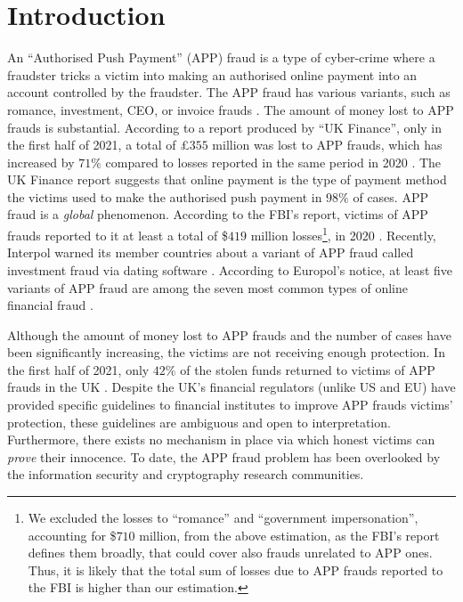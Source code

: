 

\section{Introduction}\label{sec::intro}

An  ``Authorised Push Payment'' (APP) fraud is a type of cyber-crime where a fraudster tricks a victim into making an authorised online payment into an account controlled by the fraudster. 
%
%
 The APP fraud has various variants, such as romance, investment, CEO, or invoice  frauds \cite{overview-of-payment-fraud}. The amount of money lost to  APP frauds is   substantial. According to a report produced by ``UK Finance'',   only in the first half of 2021, a total of £$355$ million was lost to APP frauds, which has increased by  $71\%$  compared to losses reported in the same period in 2020 \cite{2021-Half-Year-Fraud-Update}. The UK Finance report suggests that  online  payment is the type of payment method the victims used to make the authorised push payment in  $98\%$  of cases. APP fraud is a \emph{global} phenomenon. According to  the FBI's report, victims of APP frauds reported to it at least a total of  \$$419$ million losses\footnote{We  excluded the losses to ``romance'' and ``government impersonation'', accounting for \$$710$ million, from the above estimation, as  the FBI's report defines them  broadly, that could cover also  frauds unrelated to APP ones. Thus, it is likely that the total sum of losses due to APP frauds reported to the FBI is  higher than our estimation.}, in 2020 \cite{internet-crime-report}. Recently, Interpol  warned  its member countries  about a    variant of APP fraud called investment fraud via dating software \cite{interpol-notce}. According to  Europol’s notice, at least five variants of APP fraud are among the seven most common types of online financial fraud \cite{europol-notice}. 





Although the amount of money lost to  APP frauds and the number of cases have been significantly  increasing, the victims are not receiving  enough protection.  In the first half of 2021, only $42\%$ of the stolen funds returned to victims of  APP frauds in the UK \cite{2021-Half-Year-Fraud-Update}.  Despite  the UK's financial  regulators (unlike   US and EU)  have provided specific guidelines to financial institutes to  improve APP frauds victims' protection, these guidelines are  ambiguous and    open to interpretation. Furthermore,  there exists  no  mechanism in place via which honest victims can  \emph{prove} their innocence. To date, the APP fraud problem has been overlooked by the information security and cryptography research communities.


